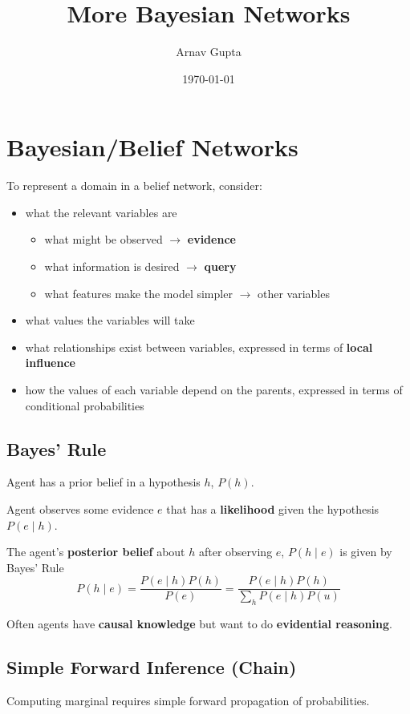 \documentclass[11pt]{article}
\author{Arnav Gupta}
\date{\today}
\title{More Bayesian Networks}
\begin{document}
\maketitle
\tableofcontents

\section{Bayesian/Belief Networks}
\label{sec:orgc9286a6}
To represent a domain in a belief network, consider:
\begin{itemize}
\item what the relevant variables are
\begin{itemize}
\item what might be observed \(\to\) \textbf{evidence}
\item what information is desired \(\to\) \textbf{query}
\item what features make the model simpler \(\to\) other variables
\end{itemize}
\item what values the variables will take
\item what relationships exist between variables, expressed in terms of \textbf{local influence}
\item how the values of each variable depend on the parents, expressed in terms of conditional probabilities
\end{itemize}
\subsection{Bayes' Rule}
\label{sec:org89c4b8c}
Agent has a prior belief in a hypothesis \(h\), \(P(h)\).

Agent observes some evidence \(e\) that has a \textbf{likelihood} given the hypothesis \(P(e \mid h)\).

The agent's \textbf{posterior belief} about \(h\) after observing \(e\), \(P(h \mid e)\)
is given by Bayes' Rule
$$ P(h \mid e) = \frac{P(e \mid h) P(h)}{P(e)} = \frac{P(e \mid h) P(h)}{\sum_{h} P(e \mid h) P(u)} $$

Often agents have \textbf{causal knowledge} but want to do \textbf{evidential reasoning}.
\subsection{Simple Forward Inference (Chain)}
\label{sec:org401d23b}
Computing marginal requires simple forward propagation of probabilities.
\end{document}
